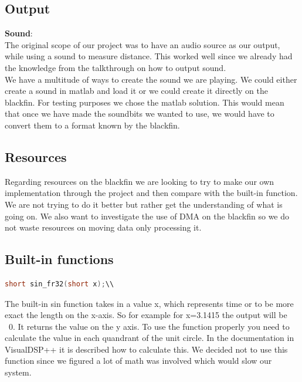 \subsection{Output}
\textbf{Sound}:\\
The original scope of our project was to have an audio source as our output, while using a sound to measure distance. This worked well since we already had the knowledge from the talkthrough on how to output sound.\\
We have a multitude of ways to create the sound we are playing. We could either create a sound in matlab and load it or we could create it directly on the blackfin. For testing purposes we chose the matlab solution. This would mean that once we have made the soundbits we wanted to use, we would have to convert them to a format known by the blackfin.





\subsection{Resources}
Regarding resources on the blackfin we are looking to try to make our own implementation through the project and then compare with the built-in function. We are not trying to do it better but rather get the understanding of what is going on.
We also want to investigate the use of DMA on the blackfin so we do not waste resources on moving data only processing it.



\subsection{Built-in functions}
\begin{lstlisting}[language=C]
short sin_fr32(short x);\\
\end{lstlisting}
The built-in sin function takes in a value x, which represents time or to be more exact the length on the x-axis. So for example for x=3.1415 the output will be ~0. It returns the value on the y axis. To use the function properly you need to calculate the value in each quandrant of the unit circle. In the documentation in VisualDSP++ it is described how to calculate this. We decided not to use this function since we figured a lot of math was involved which would slow our system.

